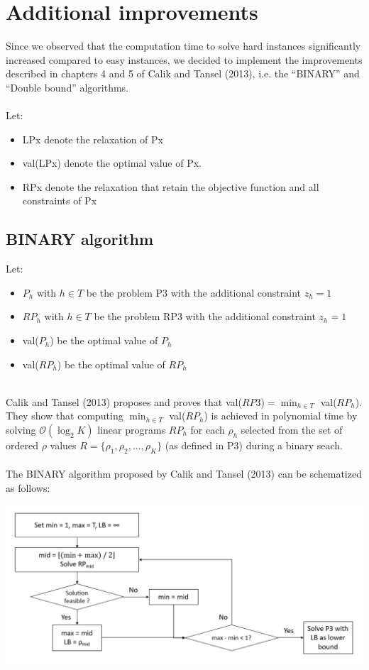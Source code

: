 \newpage
\chapter{Additional improvements}

Since we observed that the computation time to solve hard instances significantly increased compared to easy instances, we decided to implement the improvements described in chapters 4 and 5 of Calik and Tansel (2013), i.e. the ``BINARY'' and ``Double bound'' algorithms.\\\\
Let: 
\begin{itemize}
	\item LPx denote the relaxation of Px
	\item val(LPx) denote the optimal value of Px.
	\item RPx denote the relaxation that retain the objective function and all constraints of Px
\end{itemize} 

\section{BINARY algorithm}

Let:
\begin{itemize}
	\item $P_h$ with $h \in T$ be the problem P3 with the additional constraint $z_h = 1$
	\item $RP_h$ with $h \in T$ be the problem RP3 with the additional constraint $z_h = 1$
	\item val($P_h$) be the optimal value of $P_h$
	\item val($RP_h$) be the optimal value of $RP_h$
\end{itemize}\ \\
Calik and Tansel (2013) proposes and proves that val($RP3$)$ = \min_{h \in T}$ val($RP_h$). They show that computing $\min_{h \in T}$ val($RP_h$) is achieved in polynomial time by solving $\mathcal{O}\left( \log_2 K \right)$ linear programs $RP_h$ for each $\rho_h$ selected from the set of ordered $\rho$ values $R = \lbrace \rho_1, \rho_2, ..., \rho_K \rbrace$ (as defined in P3) during a binary seach.\\\\
The BINARY algorithm proposed by Calik and Tansel (2013) can be schematized as follows:
\begin{center}
	\includegraphics[width=\textwidth]{../imgs/BINARY.png}
\end{center}

